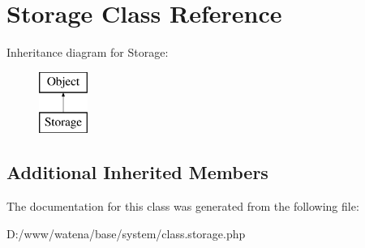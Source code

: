 \hypertarget{class_storage}{\section{Storage Class Reference}
\label{class_storage}
}
Inheritance diagram for Storage\-:\begin{figure}[H]
\begin{center}
\leavevmode
\includegraphics[height=2.000000cm]{class_storage}
\end{center}
\end{figure}
\subsection*{Additional Inherited Members}


The documentation for this class was generated from the following file\-:\begin{DoxyCompactItemize}
\item 
D\-:/www/watena/base/system/class.\-storage.\-php\end{DoxyCompactItemize}
